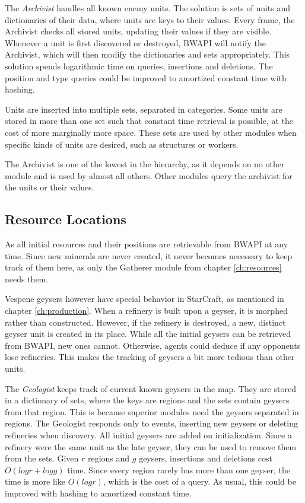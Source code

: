The \emph{Archivist} handles all known enemy units. The solution is sets of units and dictionaries of their data, where units are keys to their values. Every frame, the Archivist checks all stored units, updating their values if they are visible. Whenever a unit is first discovered or destroyed, BWAPI will notify the Archivist, which will then modify the dictionaries and sets appropriately. This solution spends logarithmic time on queries, insertions and deletions. The position and type queries could be improved to amortized constant time with hashing.

Units are inserted into multiple sets, separated in categories. Some units are stored in more than one set such that constant time retrieval is possible, at the cost of more marginally more space. These sets are used by other modules when specific kinds of units are desired, such as structures or workers.

The Archivist is one of the lowest in the hierarchy, as it depends on no other module and is used by almost all others. Other modules query the archivist for the units or their values.

	\subsection*{Resource Locations}
	As all initial resources and their positions are retrievable from BWAPI at any time. Since new minerals are never created, it never becomes necessary to keep track of them here, as only the Gatherer module from chapter \ref{ch:resources} needs them.
	
	Vespene geysers however have special behavior in StarCraft, as mentioned in chapter \ref{ch:production}. When a refinery is built upon a geyser, it is morphed rather than constructed. However, if the refinery is destroyed, a new, distinct geyser unit is created in its place. While all the initial geysers can be retrieved from BWAPI, new ones cannot. Otherwise, agents could deduce if any opponents lose refineries. This makes the tracking of geysers a bit more tedious than other units.
	
	The \emph{Geologist} keeps track of current known geysers in the map. They are stored in a dictionary of sets, where the keys are regions and the sets contain geysers from that region. This is because superior modules need the geysers separated in regions. The Geologist responds only to events, inserting new geysers or deleting refineries when discovery. All initial geysers are added on initialization. Since a refinery were the same unit as the late geyser, they can be used to remove them from the sets. Given $r$ regions and $g$ geysers, insertions and deletions cost $O(log r + log g)$ time. Since every region rarely has more than one geyser, the time is more like $O(log r)$, which is the cost of a query. As usual, this could be improved with hashing to amortized constant time.

